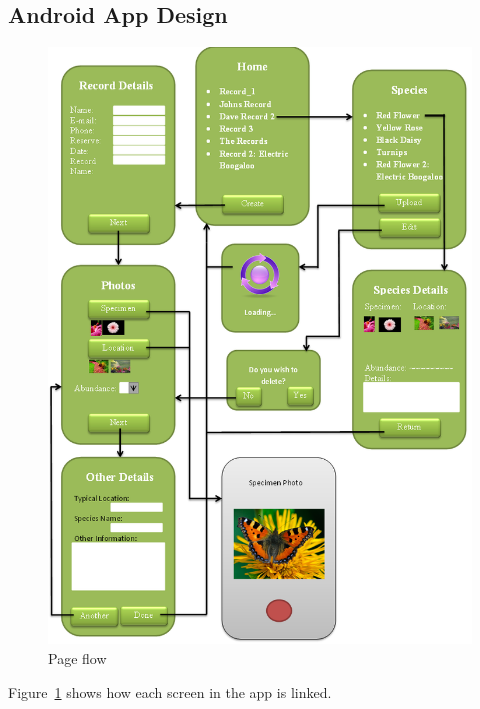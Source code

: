 \documentclass[12pt]{article}
\begin{document}
	\subsection{Android App Design}

		\begin{figure}[H]
			\begin{center}
				\includegraphics[scale=0.45]{app-PageFlow}
			\end{center}
			\caption{Page flow}
			\label{fig:app-pageflow}
		\end{figure}

		Figure~\ref{fig:app-pageflow} shows how each screen in the app is linked.
\end{document}
